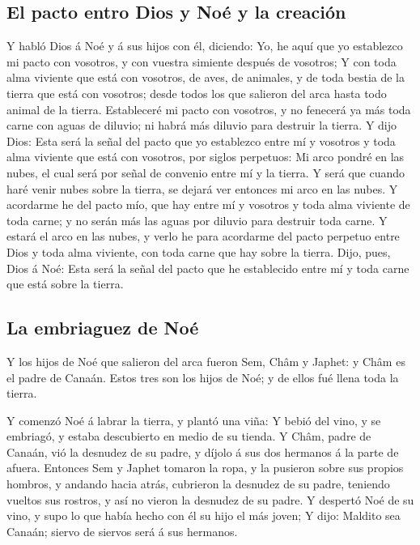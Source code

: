 \hypertarget{el-pacto-entro-dios-y-nouxe9-y-la-creaciuxf3n}{%
\subsection{El pacto entro Dios y Noé y la
creación}\label{el-pacto-entro-dios-y-nouxe9-y-la-creaciuxf3n}}

 Y habló Dios á Noé y á sus hijos con él, diciendo:
 Yo, he aquí que yo establezco mi pacto con vosotros, y con
vuestra simiente después de vosotros;  Y con toda alma
viviente que está con vosotros, de aves, de animales, y de toda bestia
de la tierra que está con vosotros; desde todos los que salieron del
arca hasta todo animal de la tierra.  Estableceré mi pacto
con vosotros, y no fenecerá ya más toda carne con aguas de diluvio; ni
habrá más diluvio para destruir la tierra.  Y dijo Dios:
Esta será la señal del pacto que yo establezco entre mí y vosotros y
toda alma viviente que está con vosotros, por siglos perpetuos:
 Mi arco pondré en las nubes, el cual será por señal de
convenio entre mí y la tierra.  Y será que cuando haré
venir nubes sobre la tierra, se dejará ver entonces mi arco en las
nubes.  Y acordarme he del pacto mío, que hay entre mí y
vosotros y toda alma viviente de toda carne; y no serán más las aguas
por diluvio para destruir toda carne.  Y estará el arco en
las nubes, y verlo he para acordarme del pacto perpetuo entre Dios y
toda alma viviente, con toda carne que hay sobre la tierra.
 Dijo, pues, Dios á Noé: Esta será la señal del pacto que
he establecido entre mí y toda carne que está sobre la tierra.

\hypertarget{la-embriaguez-de-nouxe9}{%
\subsection{La embriaguez de Noé}\label{la-embriaguez-de-nouxe9}}

 Y los hijos de Noé que salieron del arca fueron Sem, Châm
y Japhet: y Châm es el padre de Canaán.  Estos tres son los
hijos de Noé; y de ellos fué llena toda la tierra.

 Y comenzó Noé á labrar la tierra, y plantó una viña:
 Y bebió del vino, y se embriagó, y estaba descubierto en
medio de su tienda.  Y Châm, padre de Canaán, vió la
desnudez de su padre, y díjolo á sus dos hermanos á la parte de afuera.
 Entonces Sem y Japhet tomaron la ropa, y la pusieron sobre
sus propios hombros, y andando hacia atrás, cubrieron la desnudez de su
padre, teniendo vueltos sus rostros, y así no vieron la desnudez de su
padre.  Y despertó Noé de su vino, y supo lo que había
hecho con él su hijo el más joven;  Y dijo: Maldito sea
Canaán; siervo de siervos será á sus hermanos.

